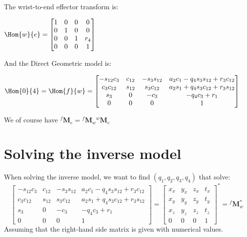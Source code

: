 \documentclass{ecnreport}
\begin{document}
The wrist-to-end effector transform is:
\begin{center}
$\Hom{w}{e} = \left[\begin{matrix}1 & 0 & 0 & 0\\
0 & 1 & 0 & 0\\0 & 0 & 1 & r_4\\0 & 0 & 0 & 1\end{matrix}\right]$
\end{center}

And the Direct Geometric model is:
\begin{center}
$\Hom{0}{4} = \Hom{f}{w} = \left[\begin{matrix}- s_{12} c_3 & c_{12} & - s_3 s_{12} & a_{2} c_1 - q_{4} s_3 s_{12} + r_{3} c_{12}\\c_3 c_{12} & s_{12} & s_3 c_{12} & a_{2} s_1 + q_{4} s_3 c_{12} + r_{3} s_{12}\\s_3 & 0 & - c_3 & - q_{4} c_3 + r_{1}\\0 & 0 & 0 & 1\end{matrix}\right]$
    \end{center}
    We of course have ${}^f\mathbf{M}_e = {}^f\mathbf{M}_w{}^w\mathbf{M}_e$

\section{Solving the inverse model}

When solving the inverse model, we want to find $(q_1, q_2, q_3, q_4)$ that solve:\\
\begin{equation} \left[\begin{matrix}- s_{12} c_3 & c_{12} & - s_3 s_{12} & a_{2} c_1 - q_{4} s_3 s_{12} + r_{3} c_{12}\\c_3 c_{12} & s_{12} & s_3 c_{12} & a_{2} s_1 + q_{4} s_3 c_{12} + r_{3} s_{12}\\s_3 & 0 & - c_3 & - q_{4} c_3 + r_{1}\\0 & 0 & 0 & 1\end{matrix}\right] = \left[\begin{matrix}x_x & y_x & z_x & t_x\\x_y & y_y & z_y & t_y\\x_z & y_z & z_z & t_z\\0 & 0 & 0 & 1\end{matrix}\right]^* = {}^f\mathbf{M}_w^*
\label{model}
\end{equation}
Assuming that the right-hand side matrix is given with numerical values.
\end{document}

